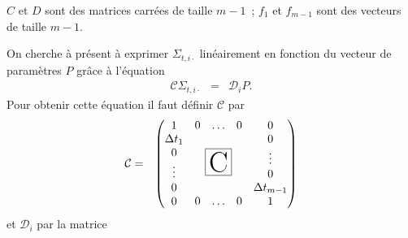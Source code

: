 \begin{Rem}
$C$ et $D$ sont des matrices carr\'ees de taille $m-1$~; $f_1$ et 
$f_{m-1}$ sont des vecteurs de taille $m-1$.
\end{Rem}

On cherche \`a pr\'esent \`a exprimer $\Sigma_{t,i \cdot}$ 
lin\'eairement en fonction du vecteur de param\`etres $P$ gr\^ace \`a 
l'\'equation 
\begin{eqnarray}
\mathcal{C} \Sigma_{t,i \cdot} &=& \mathcal{D}_i P. 
\label{lineaire2_p}
\end{eqnarray}
Pour obtenir cette \'equation il faut d\'efinir $\mathcal{C}$ par 
\setlength{\fboxsep}{24pt}
\begin{eqnarray*}
\mathcal{C} &=& \begin{pmatrix} 
1 & \begin{matrix} 0 &\ldots & 0 \end{matrix} & 0\\
\begin{matrix} \Delta t_1\\0\\ \vdots\\0 \end{matrix} & 
\raisebox{-1ex}{\fbox{\Huge C}} & \begin{matrix} 0\\ \vdots\\0 \\ 
\Delta t_{m-1} \end{matrix}\\
0 &  \begin{matrix}0 &\ldots &0 \end{matrix} & 1
\end{pmatrix}
\end{eqnarray*}
et $\mathcal{D}_i$ par la matrice 
\newcommand{\matZeros}{\vdots ~~~~ \vdots}
\setlength{\fboxsep}{3pt}
\setcounter{MaxMatrixCols}{20}
